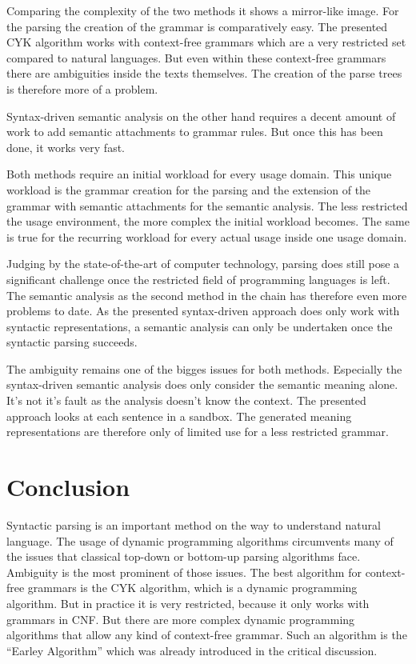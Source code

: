 \documentclass[12pt,twoside]{scrartcl}
\theoremstyle{plain}
\theoremstyle{definition}
\theoremstyle{remark}
\begin{document}
	
	Comparing the complexity of the two methods it shows a mirror-like image. For the parsing the creation of the grammar is comparatively easy. The presented CYK algorithm works with context-free grammars which are a very restricted set compared to natural languages. But even within these context-free grammars there are ambiguities inside the texts themselves. The creation of the parse trees is therefore more of a problem.
	
	Syntax-driven semantic analysis on the other hand requires a decent amount of work to add semantic attachments to grammar rules.\cite{Jurafsky2009} But once this has been done, it works very fast.
	
	Both methods require an initial workload for every usage domain. This unique workload is the grammar creation for the parsing and the extension of the grammar with semantic attachments for the semantic analysis. The less restricted the usage environment, the more complex the initial workload becomes. The same is true for the recurring workload for every actual usage inside one usage domain.
	
	Judging by the state-of-the-art of computer technology, parsing does still pose a significant challenge once the restricted field of programming languages is left. The semantic analysis as the second method in the chain has therefore even more problems to date. As the presented syntax-driven approach does only work with syntactic representations\cite{Jurafsky2009}, a semantic analysis can only be undertaken once the syntactic parsing succeeds.
	
	The ambiguity remains one of the bigges issues for both methods. Especially the syntax-driven semantic analysis does only consider the semantic meaning alone. It's not it's fault as the analysis doesn't know the context. The presented approach looks at each sentence in a sandbox. The generated meaning representations are therefore only of limited use for a less restricted grammar.
	
\section{Conclusion}
\label{sec:concl}

	Syntactic parsing is an important method on the way to understand natural language. The usage of dynamic programming algorithms circumvents many of the issues that classical top-down or bottom-up parsing algorithms face. Ambiguity is the most prominent of those issues. The best algorithm for context-free grammars is the CYK algorithm, which is a dynamic programming algorithm. But in practice it is very restricted, because it only works with grammars in CNF. But there are more complex dynamic programming algorithms that allow any kind of context-free grammar. Such an algorithm is the ``Earley Algorithm''\cite[p.~477]{Jurafsky2009b} which was already introduced in the critical discussion.
	
\end{document}
